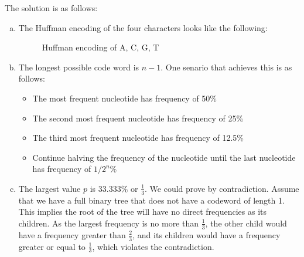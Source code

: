 \documentclass[10pt]{article}
\begin{document}
\begin{solution}
    The solution is as follows:
    \begin{enumerate}[(a)]
        \item The Huffman encoding of the four characters looks like the following:
        \begin{figure}[ht]
            \centering
                \caption{Huffman encoding of A, C, G, T}
        \end{figure}
        \item The longest possible code word is $n-1$. One senario that achieves this is as follows:
        \begin{itemize}
            \item The most frequent nucleotide has frequency of 50\%
            \item The second most frequent nucleotide has frequency of 25\%
            \item The third most frequent nucleotide has frequency of 12.5\%
            \item Continue halving the frequency of the nucleotide until the last nucleotide has frequency of $1/2^n\%$
        \end{itemize}
        \item The largest value $p$ is $33.333\%$ or $\frac{1}{3}$. We could prove by contradiction. Assume that we have a full binary tree that does not have a codeword of length 1. This implies the root of the tree will have no direct frequencies as its children.
        As the largest frequency is no more than $\frac{1}{3}$, the other child would have a frequency greater than $\frac{2}{3}$, and its children would have a frequency greater or equal to $\frac{1}{3}$, which violates the contradiction. 
    \end{enumerate}
\end{solution}
\end{document}
